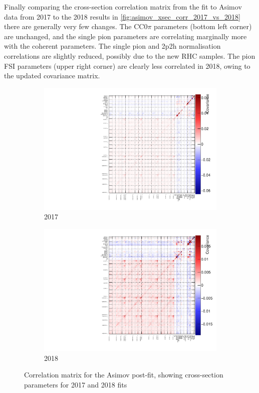Finally comparing the cross-section correlation matrix from the fit to Asimov data from 2017 to the 2018 results in \autoref{fig:asimov_xsec_corr_2017_vs_2018} there are generally very few changes. The CC0$\pi$ parameters (bottom left corner) are unchanged, and the single pion parameters are correlating marginally more with the coherent parameters. The single pion and 2p2h normalisation correlations are slightly reduced, possibly due to the new RHC \numubar samples. The pion FSI parameters (upper right corner) are clearly less correlated in 2018, owing to the updated covariance matrix.
\begin{figure}[h]
	\begin{subfigure}[t]{0.49\textwidth}
		\includegraphics[width=\textwidth, trim={0mm 0mm 0mm 0mm}, clip,page=12]{figures/mach3/Asimov/2017b_NewDet_NewData_Asimov_Long_0_drawCorr.pdf}
		\caption{2017}
	\end{subfigure}
	\begin{subfigure}[t]{0.49\textwidth}
		\includegraphics[width=\textwidth, trim={0mm 0mm 0mm 0mm}, clip,page=12]{figures/mach3/2018/asimov/corr/2018a_MultiPi_Binningv6_NewCov_Asimov_merge_drawCorr}
		\caption{2018}
	\end{subfigure}
	\caption{Correlation matrix for the Asimov post-fit, showing cross-section parameters for 2017 and 2018 fits}
	\label{fig:asimov_xsec_corr_2017_vs_2018}
\end{figure}

